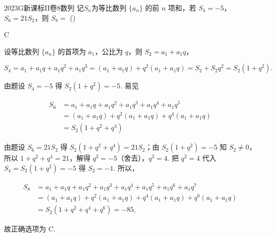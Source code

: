 
\begin{problem}{2023}{G}{新课标II卷}{8}{数列}
记$S_n$为等比数列 $\{a_n\}$ 的前 $n$ 项和，若 $S_4=-5$，$S_6=21S_2$，则 $S_8=$ (\hspace{1cm})
\begin{choices}
\end{choices}
\end{problem}

\begin{answer}
C
\end{answer}

\begin{solutions}
设等比数列 $\{a_n\}$ 的首项为 $a_1$，公比为 $q$，则 $S_2=a_1+a_1q$，

$$
S_4=a_1+a_1q+a_1q^2+a_1q^3=(a_1+a_1q)+q^2(a_1+a_1q)=S_2+S_2q^2=S_2(1+q^2).
$$

由题设 $S_4=-5$ 得 $S_2(1+q^2)=-5$. 易见

$$
\begin{aligned}
S_6&=a_1+a_1q+a_1q^2+a_1q^3+a_1q^4+a_1q^5\\
&=(a_1+a_1q)+q^2(a_1+a_1q)+q^4(a_1+a_1q)\\
&=S_2(1+q^2+q^4)
\end{aligned}
$$

由题设 $S_6=21S_2$ 得 $S_2(1+q^2+q^4)=21S_2$；由 $S_2(1+q^2)=-5$ 知 $S_2\neq0$，所以 $1+q^2+q^4=21$，解得 $q^2=-5$（舍去），$q^2=4$. 把 $q^2=4$ 代入 $S_4=S_2(1+q^2)=-5$ 得 $S_2=-1$. 所以，

$$
\begin{aligned}
S_8&=a_1+a_1q+a_1q^2+a_1q^3+a_1q^4+a_1q^5+a_1q^6+a_1q^7\\
&=(a_1+a_1q)+q^2(a_1+a_1q)+q^4(a_1+a_1q)+q^6(a_1+a_1q)\\
&=S_2(1+q^2+q^4+q^6)=-85,
\end{aligned}
$$

故正确选项为 C.
\end{solutions}